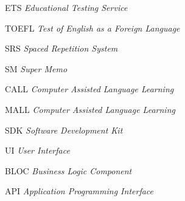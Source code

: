 \begin{siglas}
  \item[ETS] \textit{Educational Testing Service}
  \item[TOEFL] \textit{Test of English as a Foreign Language}
  \item[SRS] \textit{Spaced Repetition System}
  \item[SM] \textit{Super Memo}
  \item[CALL] \textit{Computer Assisted Language Learning}
  \item[MALL]  \textit{Computer Assisted Language Learning}
  \item[SDK] \textit{Software Development Kit}
  \item[UI] \textit{User Interface}
  \item[BLOC] \textit{Business Logic Component}
  \item[API] \textit{Application Programming Interface}
\end{siglas}